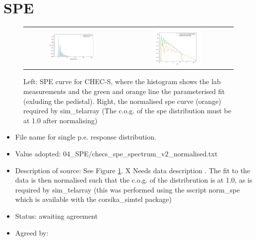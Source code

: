 \documentclass[GCT,short]{gct}
\begin{document}
\section{SPE}

\begin{figure}[h!]
\centering
\begin{tabular}{cc}
\includegraphics[width=0.5\textwidth]{../04_SPE/checs_spe_spectrum_v2.pdf} & \includegraphics[width=0.45\textwidth]{../04_SPE/SPEnorm_v2.png}  \\
\end{tabular}
\caption{Left: SPE curve for CHEC-S, where the histogram shows the lab measurements and the green and orange line the parameterised fit (exluding the pedistal). Right, the normalised spe curve (orange) required by sim\_telarray (The c.o.g. of the spe distribution must be at 1.0 after normalising)}
\label{fig:spe}
\end{figure}

\begin{itemize}
\item File name for single p.e. response distribution.
\item Value adopted: 04\_SPE/checs\_spe\_spectrum\_v2\_normalised.txt
\item Description of source: See Figure \ref{fig:spe}. \color{red} X Needs data description \color{black}. The fit to the data is then normalised such that the c.o.g. of the distribrution is at 1.0, as is required by sim\_telarray (this was performed using the sscript norm\_spe which is available with the corsika\_simtel package)
\item Status: \color{orange}awaiting agreement\color{black}
\item Agreed by: 
\end{itemize}
\end{document}
